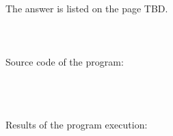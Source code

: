 \documentclass{article}
\begin{document}
\paragraph{}\
	The answer is listed on the page TBD.
	
\paragraph{}\
\paragraph{}\
Source code of the program:

\begin{verbatim}
\end{verbatim}

\paragraph{}\
\paragraph{}\
	Results of the program execution:
	
\begin{verbatim} 
\end{verbatim}

\paragraph{}\
\paragraph{}\
\end{document}
